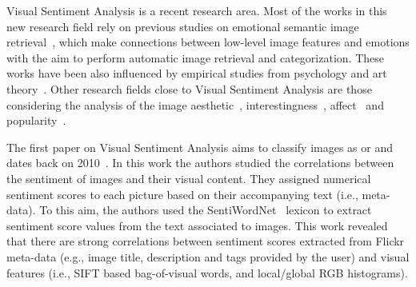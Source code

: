 Visual Sentiment Analysis is a recent research area.
Most of the works in this new research field rely on previous studies on emotional semantic image retrieval~\cite{colombo1999semantics, schmidt2009collective, wei2006image, zhao2014affective}, which make connections between low-level image features and emotions with the aim to perform automatic image retrieval and categorization. These works have been also influenced by empirical studies from psychology and art theory~\cite{bradley1994emotional,itten1973art, lang1993network, osgood1952nature, russell1977evidence, valdez1994effects}.
Other research fields close to Visual Sentiment Analysis are those considering the analysis of the image aesthetic~\cite{datta2006studying, joshi2011aesthetics, marchesotti2011assessing,Ravi2012}, interestingness~\cite{isola2011makes}, affect~\cite{jia2012can} and popularity~\cite{gelli2015image,khosla2014makes,mcparlane2014nobody,totti2014impact}.


The first paper on Visual Sentiment Analysis aims to classify images as  or  and dates back on 2010~\cite{siersdorfer2010analyzing}.
In this work the authors studied the correlations between the sentiment of images and their visual content. 
They assigned numerical sentiment scores to each picture based on their accompanying text (i.e., meta-data). To this aim, the authors used the  SentiWordNet~\cite{esuli2006sentiwordnet} lexicon to extract sentiment score values from the text associated to images.
This work revealed that there are strong correlations between sentiment scores extracted from Flickr meta-data (e.g., image title, description and tags provided by the user) and visual features (i.e., SIFT based bag-of-visual words, and local/global RGB histograms). 

